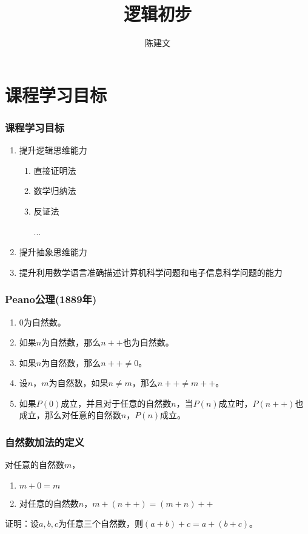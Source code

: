 \documentclass{beamer}
\begin{document}
\begin{CJK*}{UTF8}{gbsn}

\newtheorem{Thm}{定理}[section]
\theoremstyle{definition}
\newtheorem{Def}{定义}[section]
\theoremstyle{example}
\newtheorem*{Ex}{例：}
\newtheorem{Exercise}{习题}

\date{}
\author{陈建文}

\title{逻辑初步}
\begin{frame}
  \titlepage
\end{frame}  
\section{课程学习目标}
\begin{frame}
  \frametitle{课程学习目标}
\begin{enumerate}
\item 提升逻辑思维能力
  \begin{enumerate}
  \item 直接证明法
  \item 数学归纳法
  \item 反证法

    ...
  \end{enumerate}
\item 提升抽象思维能力
\item 提升利用数学语言准确描述计算机科学问题和电子信息科学问题的能力
\end{enumerate}

\end{frame}
\begin{frame}
  \frametitle{Peano公理(1889年)}
  \begin{enumerate}
    \item 0为自然数。
    \item 如果$n$为自然数，那么$n++$也为自然数。
    \item 如果$n$为自然数，那么$n++ \neq 0$。
    \item 设$n$，$m$为自然数，如果$n \neq m$，那么$n++ \neq m++$。
    \item 如果$P(0)$成立，并且对于任意的自然数$n$，当$P(n)$成立时，$P(n++)$也成立，那么对任意的自然数$n$，$P(n)$成立。 
    \end{enumerate}  
  \end{frame}
  \begin{frame}
  \frametitle{自然数加法的定义}
        对任意的自然数$m$，
    \begin{enumerate}
    \item $m + 0 = m$
    \item 对任意的自然数$n$，$m + (n++) = (m + n)++$
    \end{enumerate}
  \end{frame}
  \begin{frame}
        证明：设$a, b, c$为任意三个自然数，则$(a + b) + c = a + (b + c)$。


\end{frame}
\end{CJK*}
\end{document}
